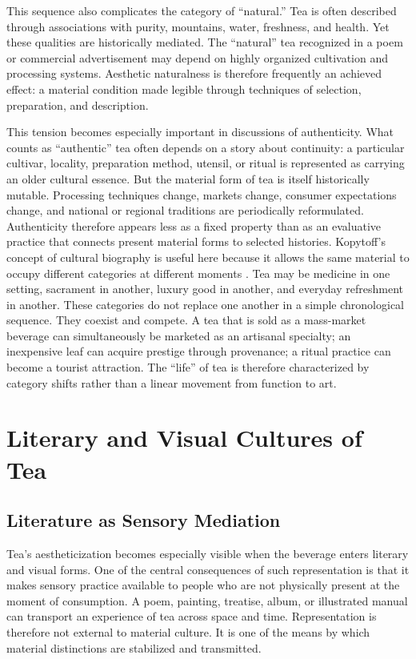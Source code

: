 \documentclass[numbers]{IntechOpen-Book}
\begin{document}
This sequence also complicates the category of ``natural.'' Tea is often described through associations with purity, mountains, water, freshness, and health. Yet these qualities are historically mediated. The ``natural'' tea recognized in a poem or commercial advertisement may depend on highly organized cultivation and processing systems. Aesthetic naturalness is therefore frequently an achieved effect: a material condition made legible through techniques of selection, preparation, and description.

This tension becomes especially important in discussions of authenticity. What counts as ``authentic'' tea often depends on a story about continuity: a particular cultivar, locality, preparation method, utensil, or ritual is represented as carrying an older cultural essence. But the material form of tea is itself historically mutable. Processing techniques change, markets change, consumer expectations change, and national or regional traditions are periodically reformulated. Authenticity therefore appears less as a fixed property than as an evaluative practice that connects present material forms to selected histories. Kopytoff's concept of cultural biography is useful here because it allows the same material to occupy different categories at different moments \cite{kopytoff}. Tea may be medicine in one setting, sacrament in another, luxury good in another, and everyday refreshment in another. These categories do not replace one another in a simple chronological sequence. They coexist and compete. A tea that is sold as a mass-market beverage can simultaneously be marketed as an artisanal specialty; an inexpensive leaf can acquire prestige through provenance; a ritual practice can become a tourist attraction. The ``life'' of tea is therefore characterized by category shifts rather than a linear movement from function to art.

\section{Literary and Visual Cultures of Tea}

\subsection{Literature as Sensory Mediation}

Tea's aestheticization becomes especially visible when the beverage enters literary and visual forms. One of the central consequences of such representation is that it makes sensory practice available to people who are not physically present at the moment of consumption. A poem, painting, treatise, album, or illustrated manual can transport an experience of tea across space and time. Representation is therefore not external to material culture. It is one of the means by which material distinctions are stabilized and transmitted.
\end{document}

